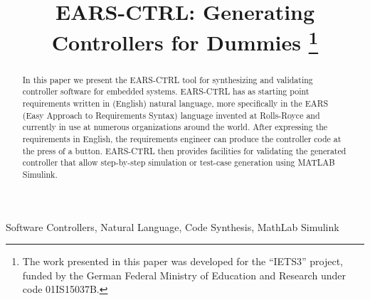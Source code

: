 \documentclass[conference]{IEEEtran}
\begin{document}
\title{EARS-CTRL: Generating Controllers for Dummies
\thanks{The work presented in this paper was developed for the ``IETS3'' project, funded
by the German Federal Ministry of Education and Research under code
01IS15037B.}
}

\author{
\and
{}
\and
{}
\and
\hspace{7.3cm}
\hspace{7.3cm}
}

\maketitle

\begin{abstract}
In this paper we present the EARS-CTRL tool for synthesizing and validating
controller software for embedded systems. EARS-CTRL has as starting point
requirements written in (English) natural language, more specifically in the
EARS (Easy Approach to Requirements Syntax) language invented at Rolls-Royce and
currently in use at numerous organizations around the world. After expressing
the requirements in English, the requirements engineer can produce the
controller code at the press of a button. 
EARS-CTRL then provides facilities for validating the generated controller that
allow step-by-step simulation or test-case generation using MATLAB
Simulink.
\end{abstract}

\begin{IEEEkeywords}
Software Controllers, Natural Language, Code Synthesis, MathLab Simulink
\end{IEEEkeywords}

  

 







\end{document}
